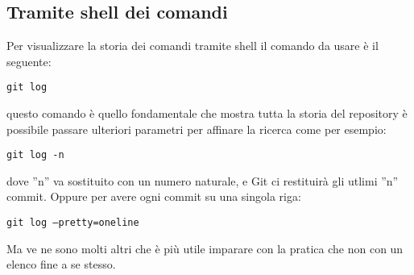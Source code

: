 \subsection{Tramite shell dei comandi}
Per visualizzare la storia dei comandi tramite shell il comando da usare è il seguente:

\begin{center}
\texttt{git log}
\end{center}

questo comando è quello fondamentale che mostra tutta la storia del repository è possibile passare ulteriori parametri per affinare la ricerca come per esempio:

\begin{center}
\texttt{git log -n}
\end{center}

dove ''n'' va sostituito con un numero naturale, e Git ci restituirà gli utlimi ''n'' commit. Oppure per avere ogni commit su una singola riga:

\begin{center}
\texttt{git log --pretty=oneline}
\end{center}

Ma ve ne sono molti altri che è più utile imparare con la pratica che non con un elenco fine a se stesso.